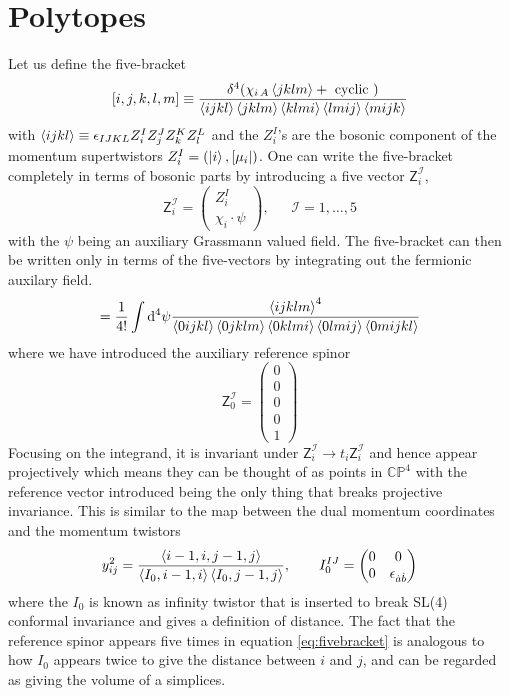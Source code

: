 \documentclass[a4paper,12pt]{article}
\begin{document}
\section{Polytopes}
Let us define the five-bracket
\begin{equation} \label{eq:fivebracket}
[i,j,k,l,m]\equiv \frac{\delta^4(\chi_{i\,A}\expval{jklm}+\text{ cyclic })}{\expval{ijkl}\expval{jklm}\expval{klmi}\expval{lmij}\expval{mijk}}
\end{equation}
with $\expval{ijkl}\equiv\epsilon_{IJKL}Z^{I}_{i}Z^{J}_{j}Z^{K}_{k}Z^{L}_{l}$ and the $Z_i^I$'s are the bosonic component of the momentum supertwistors $Z_i^I=(\ket{i},[\mu_i|)$. One can write the five-bracket completely in terms of bosonic parts by introducing a five vector $\mathsf{Z}_i^\mathcal{I}$,
\begin{equation}
	\mathsf{Z}_i^\mathcal{I}=\begin{pmatrix} Z_i^I\\\chi_i\cdot \psi
	\end{pmatrix},~~~~~~~\mathcal{I}=1,\dots,5
\end{equation}
with the $\psi$ being an auxiliary Grassmann valued field. The five-bracket can then be written only in terms of the five-vectors by integrating out the fermionic auxilary field.
\begin{equation}
[i,j,k,l,m]=\frac{1}{4!}\int \dd^4\psi \frac{\expval{ijklm}^4}{\expval{0ijkl}\expval{0jklm}\expval{0klmi}\expval{0lmij}\expval{0mijkl}}
\end{equation}
where we have introduced the auxiliary reference spinor 
\begin{equation}
	\mathsf{Z}_0^\mathcal{I}=\begin{pmatrix}
0\\0\\0\\0\\1
	\end{pmatrix}
\end{equation} 
Focusing on the integrand, it is invariant under $	\mathsf{Z}_i^\mathcal{I}\to 	t_i\mathsf{Z}_i^\mathcal{I}$ and hence appear projectively which means they can be thought of as points in $\mathds{CP}^4$ with the reference vector introduced being the only thing that breaks projective invariance. This is similar to the map between the dual momentum coordinates and the momentum twistors
\begin{equation}
y^2_{ij}=\frac{\expval{i-1,i,j-1,j}}{\expval{I_0,i-1,i}\expval{I_0,j-1,j}},\qquad I_0^{IJ}=\begin{pmatrix}
0 & 0 \\
0 & \epsilon_{\dot a \dot b}
\end{pmatrix}
\end{equation}
where the $I_0$ is known as infinity twistor that is inserted to break SL(4) conformal invariance and gives a definition of distance. The fact that the reference spinor appears five times in equation \eqref{eq:fivebracket} is analogous to how $I_0$ appears twice to give the distance between $i$ and $j$, and can be regarded as giving the volume of a simplices. 
\end{document}
